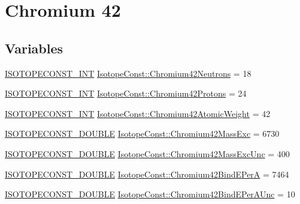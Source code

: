 \hypertarget{group___isotope_const-_chromium-_cr42}{}\section{Chromium 42}
\label{group___isotope_const-_chromium-_cr42}
\subsection*{Variables}
\begin{DoxyCompactItemize}
\item 
\mbox{\hyperlink{group___isotope_const-_macros_ga5f18360b3e99483a35c32d789e62621c}{I\+S\+O\+T\+O\+P\+E\+C\+O\+N\+S\+T\+\_\+\+I\+NT}} \mbox{\hyperlink{group___isotope_const-_chromium-_cr42_ga1035075391543b2d9794a826f3ac4b6e}{Isotope\+Const\+::\+Chromium42\+Neutrons}} = 18
\item 
\mbox{\hyperlink{group___isotope_const-_macros_ga5f18360b3e99483a35c32d789e62621c}{I\+S\+O\+T\+O\+P\+E\+C\+O\+N\+S\+T\+\_\+\+I\+NT}} \mbox{\hyperlink{group___isotope_const-_chromium-_cr42_ga6399b2692241b1bd3e7075b63bf79e68}{Isotope\+Const\+::\+Chromium42\+Protons}} = 24
\item 
\mbox{\hyperlink{group___isotope_const-_macros_ga5f18360b3e99483a35c32d789e62621c}{I\+S\+O\+T\+O\+P\+E\+C\+O\+N\+S\+T\+\_\+\+I\+NT}} \mbox{\hyperlink{group___isotope_const-_chromium-_cr42_ga0eb0e8f5f4665b2de04b8f25bdcaeb79}{Isotope\+Const\+::\+Chromium42\+Atomic\+Weight}} = 42
\item 
\mbox{\hyperlink{group___isotope_const-_macros_ga8f45a7272ce02c0b4c65c44636ed719a}{I\+S\+O\+T\+O\+P\+E\+C\+O\+N\+S\+T\+\_\+\+D\+O\+U\+B\+LE}} \mbox{\hyperlink{group___isotope_const-_chromium-_cr42_ga31a4fb904f664f6158d8cbad8ef40a10}{Isotope\+Const\+::\+Chromium42\+Mass\+Exc}} = 6730
\item 
\mbox{\hyperlink{group___isotope_const-_macros_ga8f45a7272ce02c0b4c65c44636ed719a}{I\+S\+O\+T\+O\+P\+E\+C\+O\+N\+S\+T\+\_\+\+D\+O\+U\+B\+LE}} \mbox{\hyperlink{group___isotope_const-_chromium-_cr42_ga2e5cb82ee8fd78919aaa82c14b336420}{Isotope\+Const\+::\+Chromium42\+Mass\+Exc\+Unc}} = 400
\item 
\mbox{\hyperlink{group___isotope_const-_macros_ga8f45a7272ce02c0b4c65c44636ed719a}{I\+S\+O\+T\+O\+P\+E\+C\+O\+N\+S\+T\+\_\+\+D\+O\+U\+B\+LE}} \mbox{\hyperlink{group___isotope_const-_chromium-_cr42_ga91afd1f19ba5a98f759184d0fb9fc526}{Isotope\+Const\+::\+Chromium42\+Bind\+E\+PerA}} = 7464
\item 
\mbox{\hyperlink{group___isotope_const-_macros_ga8f45a7272ce02c0b4c65c44636ed719a}{I\+S\+O\+T\+O\+P\+E\+C\+O\+N\+S\+T\+\_\+\+D\+O\+U\+B\+LE}} \mbox{\hyperlink{group___isotope_const-_chromium-_cr42_ga5d2e797d342b838d27bd7a0a9735b1d1}{Isotope\+Const\+::\+Chromium42\+Bind\+E\+Per\+A\+Unc}} = 10

\end{DoxyCompactItemize}
